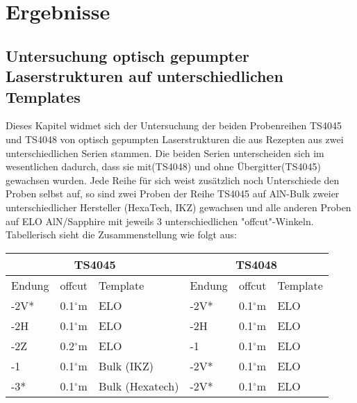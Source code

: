 \chapter{Ergebnisse}
\thispagestyle{fancy}
\section{Untersuchung optisch gepumpter Laserstrukturen auf unterschiedlichen Templates}


Dieses Kapitel widmet sich der Untersuchung der beiden Probenreihen TS4045 und TS4048 von optisch gepumpten Laserstrukturen die aus Rezepten aus zwei unterschiedlichen Serien stammen. Die beiden Serien unterscheiden sich im wesentlichen dadurch, dass sie mit(TS4048) und ohne Übergitter(TS4045) gewachsen wurden. Jede Reihe für sich weist  zusätzlich noch Unterschiede den Proben selbst auf, so sind zwei Proben der Reihe TS4045 auf AlN-Bulk zweier unterschiedlicher Hersteller (HexaTech, IKZ) gewachsen und alle  anderen Proben auf ELO AlN/Sapphire mit jeweils 3 unterschiedlichen "offcut"-Winkeln. Tabellerisch sieht die  Zusammenstellung wie folgt aus: 

\vspace{1cm}


\setlength{\arrayrulewidth}{0.5mm}
\setlength{\tabcolsep}{0.5pt}
\renewcommand{\arraystretch}{1.5}
 
{
\begin{tabular}{ |p{2cm}|p{2cm}|p{2cm}|p{2cm}|p{2cm}|p{2cm}|   }
\hline
\multicolumn{3}{|c|}{TS4045} & \multicolumn{3}{c|}{TS4048}  \\
\hline
Endung & offcut& Template & Endung & offcut& Template \\
-2V* & 0.1$^\circ$m & ELO & -2V* & 0.1$^\circ$m & ELO \\
-2H & 0.1$^\circ$m & ELO & -2H & 0.1$^\circ$m & ELO \\
-2Z & 0.2$^\circ$m & ELO & -1 & 0.1$^\circ$m & ELO \\
-1 & 0.1$^\circ$m & Bulk (IKZ) & -2V* & 0.1$^\circ$m & ELO \\
-3* & 0.1$^\circ$m & Bulk (Hexatech) & -2V* & 0.1$^\circ$m & ELO \\



\end{tabular}
}

